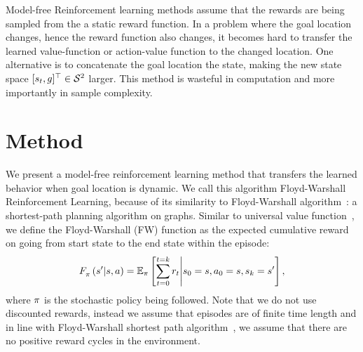 Model-free Reinforcement learning methods assume that the rewards are
being sampled from the a static reward function.  In a problem where the
goal location changes, hence the reward function also changes, it
becomes hard to transfer the learned value-function or action-value
function to the changed location.  One alternative is to concatenate the
goal location the state, making the new state space $[s_t,
g]^\top \in \mathcal{S}^2$ larger.  This method is wasteful in
computation and more importantly in sample complexity.

\section{Method}
We present a model-free reinforcement learning method that transfers the
learned behavior when goal location is dynamic. We call this algorithm
Floyd-Warshall Reinforcement Learning, because of its similarity to
Floyd-Warshall algorithm~\cite{floydwarshall1962}:
a shortest-path planning algorithm on graphs. Similar
to universal value function~\cite{schaul2015universal}, we define the Floyd-Warshall
(FW) function as the expected cumulative reward on going from start state to the
end state within the episode:
%
\begin{align}
F_{\pi}^{}\left({s'}\middle|{s}, {a}\right) =
\mathbb{E}_{\pi}\left[ \sum_{t=0}^{t=k} r_t \middle\vert s_0 = s, a_0 = s, s_k = s' \right] ,
\end{align}%
%
where $\pi$ is the
stochastic policy being followed.
Note that we do not use discounted rewards, instead we assume that episodes are
of finite time length and in line with Floyd-Warshall shortest path
algorithm~\cite{floydwarshall1962}, we assume that there are no positive reward
cycles in the environment.


